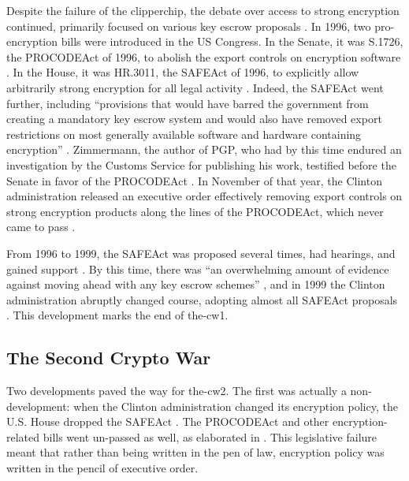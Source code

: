 Despite the failure of the \ac{clipperchip}, the debate over access to strong encryption continued, primarily focused on
various key escrow proposals \cite{thompson_2015}.
In 1996, two pro-encryption bills were introduced in the US Congress.
In the Senate, it was S.1726, the \ac{PROCODEAct} of 1996, to abolish the export controls on encryption software
\cite{burns_s1726_1996}. In the House, it was HR.3011, the \ac{SAFEAct} of 1996, to explicitly allow arbitrarily strong
encryption for all legal activity \cite{goodlatte_hr3011_1996}. Indeed, the \ac{SAFEAct} went further, including
``provisions that would have barred the government from creating a mandatory key escrow system and would also have
removed export restrictions on most generally available software and hardware containing encryption''
\cite{kehl_right_2015}. Zimmermann, the author of PGP, who had by this time endured an investigation by the Customs
Service for publishing his work, testified before the Senate in favor of the \ac{PROCODEAct} \cite{zimmermann_1996}. In
November of that year, the Clinton administration released an executive order effectively removing export controls on
strong encryption products along the lines of the \ac{PROCODEAct}, which never came to pass \cite{clinton_1996}.

From 1996 to 1999, the \ac{SAFEAct} was proposed several times, had hearings, and gained support \cite{kehl_right_2015}.
By this time, there was ``an overwhelming amount of evidence against moving ahead with any key escrow schemes''
\cite{thompson_2015}, and in 1999 the Clinton administration abruptly changed course, adopting almost all \ac{SAFEAct}
proposals \cite{kehl_right_2015}. This development marks the end of \ac{the-cw1}.

\subsection{The Second Crypto War}
\label{sec-history-cw2}

Two developments paved the way for \ac{the-cw2}. The first was actually a non-development: when the Clinton
administration changed its encryption policy, the U.S. House dropped the \ac{SAFEAct} \cite{goodlatte_hr3011_1996}. The
\ac{PROCODEAct} and other encryption-related bills went un-passed as well, as elaborated in .
This legislative failure meant that rather than being written in the pen of law, encryption policy was written in the
pencil of executive order.

